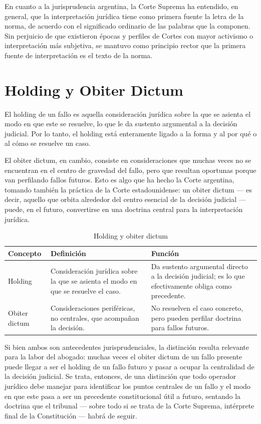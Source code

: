 \documentclass[12pt,oneside]{book}
\begin{document}
En cuanto a la jurisprudencia argentina, la Corte Suprema ha entendido, en general, que la interpretación jurídica tiene como primera fuente la letra de la norma, de acuerdo con el significado ordinario de las palabras que la componen. Sin perjuicio de que existieron épocas y perfiles de Cortes con mayor activismo o interpretación más subjetiva, se mantuvo como principio rector que la primera fuente de interpretación es el texto de la norma.

\section{Holding y Obiter Dictum}

El holding de un fallo es aquella consideración jurídica sobre la que se asienta el modo en que este se resuelve, lo que le da sustento argumental a la decisión judicial. Por lo tanto, el holding está enteramente ligado a la forma y al por qué o al cómo se resuelve un caso.

El obiter dictum, en cambio, consiste en consideraciones que muchas veces no se encuentran en el centro de gravedad del fallo, pero que resultan oportunas porque van perfilando fallos futuros. Esto es algo que ha hecho la Corte argentina, tomando también la práctica de la Corte estadounidense: un obiter dictum --- es decir, aquello que orbita alrededor del centro esencial de la decisión judicial --- puede, en el futuro, convertirse en una doctrina central para la interpretación jurídica.

\begin{table}[H]
\centering
\caption{Holding y obiter dictum}
\begin{tabularx}{\textwidth}{>{\raggedright\arraybackslash}p{} >{\raggedright\arraybackslash}X >{\raggedright\arraybackslash}X}
\toprule
\textbf{Concepto} & \textbf{Definición} & \textbf{Función} \\
\midrule
Holding & Consideración jurídica sobre la que se asienta el modo en que se resuelve el caso. & Da sustento argumental directo a la decisión judicial; es lo que efectivamente obliga como precedente. \\
Obiter dictum & Consideraciones periféricas, no centrales, que acompañan la decisión. & No resuelven el caso concreto, pero pueden perfilar doctrina para fallos futuros. \\
\bottomrule
\end{tabularx}
\end{table}

Si bien ambos son antecedentes jurisprudenciales, la distinción resulta relevante para la labor del abogado: muchas veces el obiter dictum de un fallo presente puede llegar a ser el holding de un fallo futuro y pasar a ocupar la centralidad de la decisión judicial. Se trata, entonces, de una distinción que todo operador jurídico debe manejar para identificar los puntos centrales de un fallo y el modo en que este pasa a ser un precedente constitucional útil a futuro, sentando la doctrina que el tribunal --- sobre todo si se trata de la Corte Suprema, intérprete final de la Constitución --- habrá de seguir.
\end{document}
